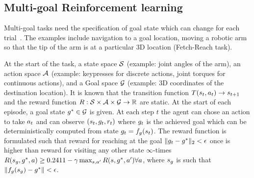\subsection{Multi-goal Reinforcement learning}
Multi-goal tasks need the specification of goal state which can change for each
trial~\citep{plappert201802multigoalrl}. The examples include navigation to a
goal location, moving a robotic arm so that the tip of the arm is at a
particular 3D location (Fetch-Reach task).

At the start of the task, a state space $\mathcal{S}$ (example: joint angles of the
arm), an action space $\mathcal{A}$ (example: keypresses for discrete actions, joint
torques for continuous actions), and a
Goal space $\mathcal{G}$ (example: 3D coordinates of the destination location).
It is known that the transition function $T(s_t, a_t) \rightarrow s_{t+1}$
and the reward function $R: \mathcal{S} \times \mathcal{A} \times \mathcal{G} \rightarrow
\mathbb{R}$ are static.
At the start of each episode, a goal state $g^* \in \mathcal{G}$ is given. At each
step $t$ the agent can chose an action to take $a_t$ and can observe
$(s_t, g_t, r_t)$ where $g_t$ is the achieved goal which can be
deterministically computed from state $g_t = f_g(s_t)$.
The reward function is formulated such that reward for reaching at the goal
$\|g_t - g^*\|_2 < \epsilon$ once
is higher than reward for visiting any other state $\infty$-times
$R(s_g, g^*, a) \ge
0.24{1}{1-\gamma}\max_{s, a'}R(s, g^*,
a') \forall a$, where $s_g$ is such that $\|f_g(s_g) -
g^*\| < \epsilon$.

